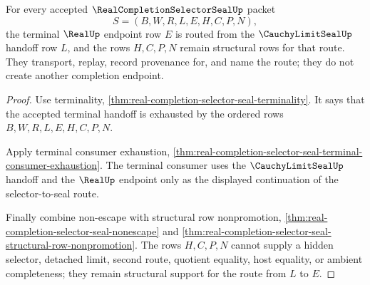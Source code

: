 \begin{theorem}
\label{thm:real-completion-selector-seal-terminal-endpoint-routing}
For every accepted $\RealCompletionSelectorSealUp$ packet
$$
S=(B,W,R,L,E,H,C,P,N),
$$
the terminal $\RealUp$ endpoint row $E$ is routed from the $\CauchyLimitSealUp$ handoff row $L$, and the rows $H,C,P,N$ remain structural rows for that route. They transport, replay, record provenance for, and name the route; they do not create another completion endpoint.
\end{theorem}
\begin{proof}
Use terminality, \autoref{thm:real-completion-selector-seal-terminality}. It says that the accepted terminal handoff is exhausted by the ordered rows $B,W,R,L,E,H,C,P,N$.

Apply terminal consumer exhaustion, \autoref{thm:real-completion-selector-seal-terminal-consumer-exhaustion}. The terminal consumer uses the $\CauchyLimitSealUp$ handoff and the $\RealUp$ endpoint only as the displayed continuation of the selector-to-seal route.

Finally combine non-escape with structural row nonpromotion, \autoref{thm:real-completion-selector-seal-nonescape} and \autoref{thm:real-completion-selector-seal-structural-row-nonpromotion}. The rows $H,C,P,N$ cannot supply a hidden selector, detached limit, second route, quotient equality, host equality, or ambient completeness; they remain structural support for the route from $L$ to $E$.
\end{proof}

